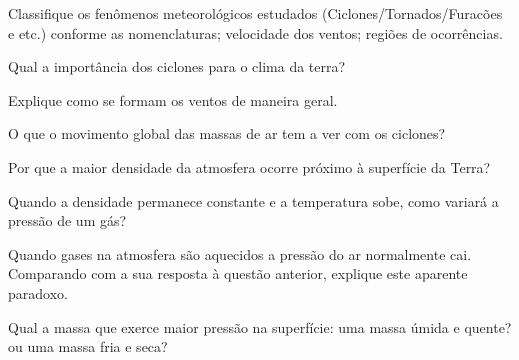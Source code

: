 \begin{quest}
	Classifique os fenômenos meteorológicos estudados (Ciclones/Tornados/Furacões e etc.) conforme as nomenclaturas; velocidade dos ventos; regiões de ocorrências.
\end{quest}

\begin{quest}
	Qual a importância dos ciclones para o clima da terra?		
\end{quest}

\begin{quest}
	Explique como se formam os ventos de maneira geral.
\end{quest}

\begin{quest}
	O que o movimento global das massas de ar tem a ver com os ciclones?
\end{quest}

\begin{quest}
	Por que a maior densidade da atmosfera ocorre próximo à superfície da Terra?		
\end{quest}

\begin{quest}
	Quando a densidade permanece constante e a temperatura sobe, como variará a pressão de um gás?		
\end{quest}

\begin{quest}
	Quando gases na atmosfera são aquecidos a pressão do ar normalmente cai. Comparando com a sua resposta à questão anterior, explique este aparente paradoxo.
\end{quest}

\begin{quest}
	Qual a massa que exerce maior pressão na superfície: uma massa úmida e quente? ou uma massa fria e seca?
\end{quest}

